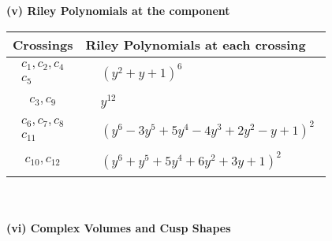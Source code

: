 \documentclass[1p]{elsarticle_modified}
\theoremstyle{definition}
\begin{document}
\newpage\renewcommand{\arraystretch}{1}
\flushleft \textbf{(v) Riley Polynomials at the component}\newline \\
\begin{tabular}{m{50pt}|m{274pt}}
Crossings & \hspace{64pt}Riley Polynomials at each crossing \\
\hline $$\begin{aligned}c_{1},c_{2},c_{4}\\c_{5}\end{aligned}$$&$\begin{aligned}
&(y^2+y+1)^6
\end{aligned}$\\
\hline $$\begin{aligned}c_{3},c_{9}\end{aligned}$$&$\begin{aligned}
&y^{12}
\end{aligned}$\\
\hline $$\begin{aligned}c_{6},c_{7},c_{8}\\c_{11}\end{aligned}$$&$\begin{aligned}
&(y^6-3 y^5+5 y^4-4 y^3+2 y^2- y+1)^2
\end{aligned}$\\
\hline $$\begin{aligned}c_{10},c_{12}\end{aligned}$$&$\begin{aligned}
&(y^6+y^5+5 y^4+6 y^2+3 y+1)^2
\end{aligned}$\\
\hline
\end{tabular}\\~\\
\newpage\flushleft \textbf{(vi) Complex Volumes and Cusp Shapes}
\end{document}
